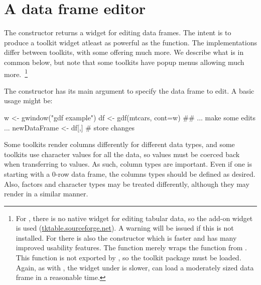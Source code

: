 

\section{A data frame editor}
\label{sec:gWidgets-an-editor-tabular}

The  constructor returns a widget for editing data
frames. The intent is to produce a toolkit widget atleast as powerful
as the  function. The implementations differ
between toolkits, with some offering much more. We describe what is in
common below, but note that some toolkits have popup menus allowing
much more.~\footnote{ For , there is no native
  widget for editing tabular data, so the  add-on widget
  is used (\url{tktable.sourceforge.net}). A warning will be issued if
  this is not installed. For  there is also the
   constructor which is faster and has many improved
  usability features. The  function merely wraps the 
  function from . This function is not exported by
  , so the toolkit package must be loaded. Again, as
  with , the widget under  is
  slower, can load a moderately sized data frame in a reasonable
  time. }


The constructor has its main argument  to specify the data
frame to edit. A basic usage might be:

\begin{Schunk}
\begin{Sinput}
 w <- gwindow("gdf example")
 df <- gdf(mtcars, cont=w)
 ## ... make some edits ...
 newDataFrame <- df[,]                   # store changes
\end{Sinput}
\end{Schunk}
%

Some toolkits render columns differently for different data types, and
some toolkits use character values for all the data, so values must be
coerced back when transferring to \R\/ values. As such, column types
are important. Even if one is starting with a $0$-row data frame, the
columns types should be defined as desired. Also, factors and
character types may be treated differently, although they may render
in a similar manner.

